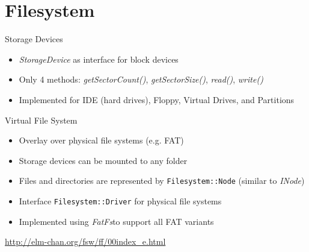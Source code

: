 \section{Filesystem}

\begin{frame}{Storage Devices}
	\begin{itemize}
		\setlength\itemsep{1em}
		\item \textit{StorageDevice} as interface for block devices
		\item Only 4 methods: \textit{getSectorCount()}, \textit{getSectorSize()}, \textit{read()}, \textit{write()}
		\item Implemented for IDE (hard drives), Floppy, Virtual Drives, and Partitions
	\end{itemize}	
\end{frame}

\begin{frame}{Virtual File System}
	\begin{itemize}
		\setlength\itemsep{1em}
		\item Overlay over physical file systems (e.g. FAT)
		\item Storage devices can be mounted to any folder
		\item Files and directories are represented by \texttt{Filesystem::Node} (similar to \textit{INode})
		\item Interface \texttt{Filesystem::Driver} for physical file systems
		\item Implemented using \textit{FatFs}\footnotemark[1] to support all FAT variants
	\end{itemize}
	\vspace{3.0em}
	\footnotemark[1]\footnotesize{\url{http://elm-chan.org/fsw/ff/00index_e.html}}
\end{frame}
